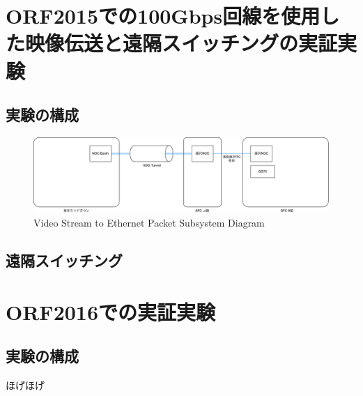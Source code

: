 \chapter{ORF2015での100Gbps回線を使用した映像伝送と遠隔スイッチングの実証実験}
\label{chap:orf2015}

\section{実験の構成}
\begin{figure}[htbp]
    \begin{center}
        \includegraphics[bb=0 0 1101 282,width=15.5cm]{img/orf2015-flow.pdf}
    \end{center}
    \caption{Video Stream to Ethernet Packet Subsystem Diagram}
    \label{fig:orf2015-flow}
\end{figure}

\section{遠隔スイッチング}

\chapter{ORF2016での実証実験}
\label{chap:orf2016}
\section{実験の構成}
ほげほげ
